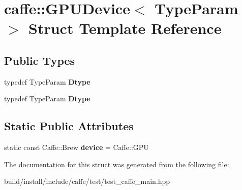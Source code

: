 \hypertarget{structcaffe_1_1_g_p_u_device}{}\section{caffe\+:\+:G\+P\+U\+Device$<$ Type\+Param $>$ Struct Template Reference}
\label{structcaffe_1_1_g_p_u_device}
\subsection*{Public Types}
\begin{DoxyCompactItemize}
\item 
\mbox{\label{structcaffe_1_1_g_p_u_device_acd4d4f749c0abd4083bc73c0867db518}} 
typedef Type\+Param {\bfseries Dtype}
\item 
\mbox{\label{structcaffe_1_1_g_p_u_device_acd4d4f749c0abd4083bc73c0867db518}} 
typedef Type\+Param {\bfseries Dtype}
\end{DoxyCompactItemize}
\subsection*{Static Public Attributes}
\begin{DoxyCompactItemize}
\item 
\mbox{\label{structcaffe_1_1_g_p_u_device_a702a137441cb2e2dcd72488ad92b6fe2}} 
static const Caffe\+::\+Brew {\bfseries device} = Caffe\+::\+G\+PU
\end{DoxyCompactItemize}


The documentation for this struct was generated from the following file\+:\begin{DoxyCompactItemize}
\item 
build/install/include/caffe/test/test\+\_\+caffe\+\_\+main.\+hpp\end{DoxyCompactItemize}
